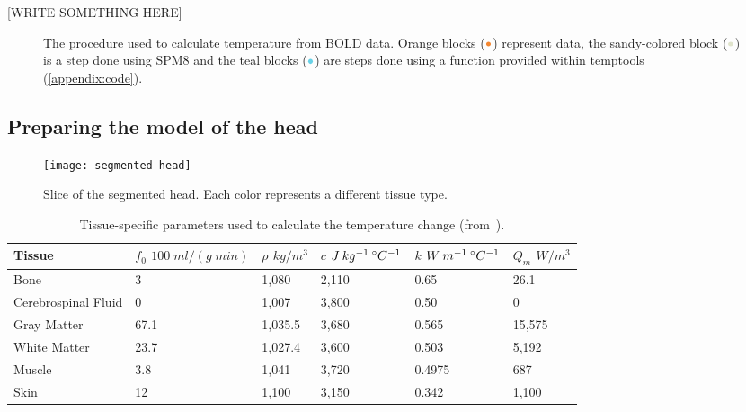   [WRITE SOMETHING HERE]
    
  \begin{figure}[tb]
    \caption[Procedure used to calculate temperature change]{\label{fig:procedureflowchart} The procedure used to calculate temperature from BOLD data.  Orange blocks ($\color{goldfish}\bullet$) represent data, the sandy-colored block ($\color{beachstorm}\bullet$) is a step done using SPM8 and the teal blocks ($\color{aoi}\bullet$) are steps done using a function provided within temptools (\cref{appendix:code}).}
    \vspace{10pt}
    \centering
    
  \end{figure}
  
    \subsection{\label{sec:prephead} Preparing the model of the head}
    \begin{figure}[tb] 
      \centering\hspace*{20px} 
    	\texttt{[image: segmented-head]} 
    	\caption{\label{fig:segmented} Slice of the segmented head. Each color represents a different tissue type.} 
    \end{figure}
    \begin{table*}[tb] 
      \caption[Tissue-specific parameters]{\label{tbl:tissues} Tissue-specific parameters used to calculate the temperature change (from~\citet{collins}).} 
      \vspace{10pt}
      \small
    		\begin{tabular*}{\linewidth}{@{} l p{2.7cm}p{2cm}p{2.4cm}p{2.5cm}p{2cm}@{}}
    		  \toprule
    		  Tissue & $f_0$ \newline $100 \; ml/(g \; min)$ & $\rho$ \newline $kg/m^{3}$ & $c$ \newline $J \: kg^{-1} \: ^\circ C^{-1}$ & $k$ \newline $W \: m^{-1} \: ^\circ C^{-1}$ & $Q_{m}$ \newline $W/m^{3}$ \\
    		  \midrule
    			Bone & 3 & 1,080 & 2,110 & 0.65 & 26.1 \\
    			Cerebrospinal Fluid & 0 & 1,007 & 3,800 & 0.50 & 0 \\
    			Gray Matter & 67.1 & 1,035.5 & 3,680 & 0.565 & 15,575 \\
    			White Matter & 23.7 & 1,027.4 & 3,600 & 0.503 & 5,192 \\
    			Muscle & 3.8 & 1,041 & 3,720 & 0.4975 & 687 \\
    			Skin & 12 & 1,100 & 3,150 & 0.342 & 1,100 \\
    			\bottomrule
    		\end{tabular*}
    \end{table*}
